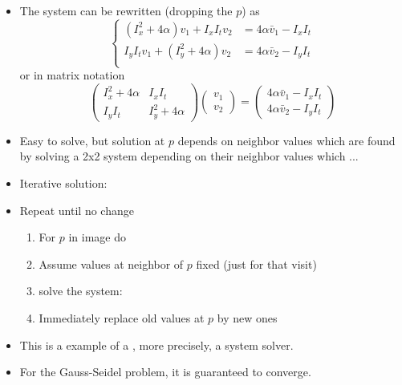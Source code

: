 \documentclass[10pt]{beamer}
\newcommand{\myemph}[1]{{\color{blue}{#1}}}
\begin{document}
\begin{frame}
  \begin{itemize}
  \item The system can be rewritten (dropping the $p$) as
    $$
    \begin{cases}
      \left(I_x^2 + 4\alpha\right)v_1 + I_x I_t v_2 &= 4\alpha \bar{v}_{1} - I_xI_t\\
      I_y I_t v_1 + \left(I_y^2 + 4\alpha\right)v_2 &= 4\alpha \bar{v}_{2} - I_yI_t\\
    \end{cases}
    $$
    or in matrix notation
    $$
    \begin{pmatrix}
      I_x^2 + 4\alpha & I_xI_t\\
      I_yI_t & I_y^2 + 4\alpha
    \end{pmatrix}
    \begin{pmatrix}
      v_1\\v_2
    \end{pmatrix}
    = 
    \begin{pmatrix}
      4\alpha \bar{v}_{1} - I_xI_t\\
      4\alpha \bar{v}_{2} - I_yI_t
    \end{pmatrix}
    $$
  \item Easy to solve, but solution at $p$ depends on neighbor values which are found by
    solving a 2x2 system depending on their neighbor values which ...
  \end{itemize}
\end{frame}

\begin{frame}
  \begin{itemize}
    \item Iterative solution:
    \item Repeat until no change
      \begin{enumerate}
      \item For $p$ in image do
      \item Assume values at neighbor of $p$ fixed (just for that visit)
      \item solve the system:
      \item Immediately replace old values at $p$ by new ones
      \end{enumerate}
    \item This is a example of a \myemph{Relaxation solver}, more precisely, a
      \myemph{Gauss-Seidel} system solver.
    \item For the Gauss-Seidel problem, it is guaranteed to converge.
  \end{itemize}
\end{frame}
\end{document}
